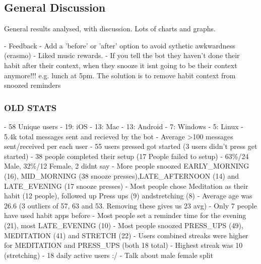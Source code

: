 \subsection{General Discussion}
General results analysed, with discussion. Lots of charts and graphs.

- Feedback
  - Add a 'before' or 'after' option to avoid sythetic awkwardness (erasmo)
  - Liked music rewards.
  - If you tell the bot they haven't done their habit after their context, when they snooze it isnt going to be their context anymore!!! e.g. lunch at 5pm. The solution is to remove habit context from snoozed reminders\newline

\subsubsection*{OLD STATS}
- 58 Unique users\newline
  - 19: iOS\newline
  - 13: Mac\newline
  - 13: Android\newline
  - 7: Windows\newline
  - 5: Linux\newline
- 5.4k total messages sent and recieved by the bot\newline
- Average >100 messages sent/received per each user\newline
- 55 users pressed got started (3 users didn't press get started)\newline
- 38 people completed their setup (17 People failed to setup)\newline
- 63\%/24 Male, 32\%/12 Female, 2 didnt say\newline
- More people snoozed EARLY\_MORNING (16), MID\_MORNING (38 snooze presses),\newline LATE\_AFTERNOON (14) and LATE\_EVENING (17 snooze presses)
- Most people chose Meditation as their habit (12 people), followed up Press ups (9) and\newline stretching (8)
- Average age was 26.6 (3 outliers of 57, 63 and 53. Removing these gives us 23 avg)\newline
- Only 7 people have used habit apps before\newline
- Most people set a reminder time for the evening (21), most LATE\_EVENING (10)\newline
- Most people snoozed PRESS\_UPS (49), MEDITATION (41) and STRETCH (22)\newline
- Users combined streaks were higher for MEDITATION and PRESS\_UPS (both 18 total)\newline
- Highest streak was 10 (stretching)\newline
- 18 daily active users :/\newline
- Talk about male female split\newline

